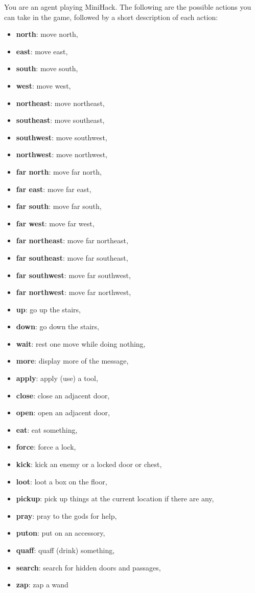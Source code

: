 \begin{MyGreenBox}[frametitle={\textbf{Iteration 1 MiniHack Prompt}}]
You are an agent playing MiniHack. The following are the possible actions you can take in the game, followed by a short description of each action:

\begin{itemize}
  \item \textbf{north}: move north,
  \item \textbf{east}: move east,
  \item \textbf{south}: move south,
  \item \textbf{west}: move west,
  \item \textbf{northeast}: move northeast,
  \item \textbf{southeast}: move southeast,
  \item \textbf{southwest}: move southwest,
  \item \textbf{northwest}: move northwest,
  \item \textbf{far north}: move far north,
  \item \textbf{far east}: move far east,
  \item \textbf{far south}: move far south,
  \item \textbf{far west}: move far west,
  \item \textbf{far northeast}: move far northeast,
  \item \textbf{far southeast}: move far southeast,
  \item \textbf{far southwest}: move far southwest,
  \item \textbf{far northwest}: move far northwest,
  \item \textbf{up}: go up the stairs,
  \item \textbf{down}: go down the stairs,
  \item \textbf{wait}: rest one move while doing nothing,
  \item \textbf{more}: display more of the message,
  \item \textbf{apply}: apply (use) a tool,
  \item \textbf{close}: close an adjacent door,
  \item \textbf{open}: open an adjacent door,
  \item \textbf{eat}: eat something,
  \item \textbf{force}: force a lock,
  \item \textbf{kick}: kick an enemy or a locked door or chest,
  \item \textbf{loot}: loot a box on the floor,
  \item \textbf{pickup}: pick up things at the current location if there are any,
  \item \textbf{pray}: pray to the gods for help,
  \item \textbf{puton}: put on an accessory,
  \item \textbf{quaff}: quaff (drink) something,
  \item \textbf{search}: search for hidden doors and passages,
  \item \textbf{zap}: zap a wand
\end{itemize}


\end{MyGreenBox}
